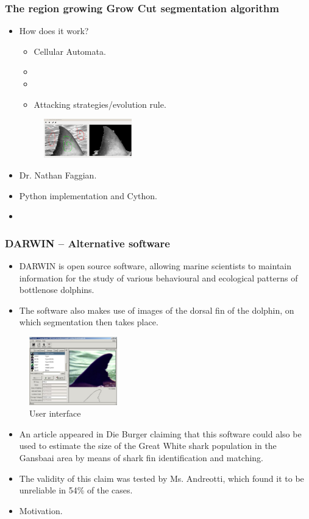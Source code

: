 \documentclass{beamer}
\begin{document}
\begin{frame}
\frametitle{The region growing Grow Cut segmentation algorithm}
\begin{itemize}
\item How does it work?
\begin{itemize}
\item Cellular Automata\cite{cellularoutomata}.
\item
\item
\item Attacking strategies/evolution rule.
\end{itemize}
\begin{figure}
\centering
\includegraphics[width=1.5in]{haaim.png}
\caption{}
\end{figure}
\item Dr. Nathan Faggian\cite{NathanFaggian}.
\item Python implementation and Cython.
\item 
\end{itemize}
\end{frame}


\begin{frame}
\frametitle{DARWIN -- Alternative software}
\begin{itemize}
\item DARWIN\cite{Darwin} is open source software, allowing marine scientists to maintain information for the study of various behavioural and ecological patterns of bottlenose dolphins.
\item The software also makes use of images of the dorsal fin of the dolphin, on which segmentation then takes place.
\end{itemize}
\begin{figure}
 \centering
 \includegraphics[width=1.5in]{Darwin.jpg}
 \caption{User interface}
\end{figure}
\end{frame}

\begin{frame}
\begin{itemize}
\item An article\cite{DieBurger} appeared in Die Burger claiming that this software could also be used to estimate the size of the Great White shark population in the Gansbaai area by means of shark fin identification and matching.
\item The validity of this claim was tested by Ms. Andreotti, which found it to be unreliable in 54\% of the cases.
\item Motivation.
\end{itemize}
\end{frame}
\end{document}
